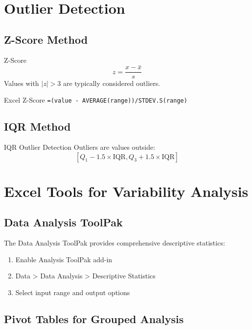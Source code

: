 \documentclass[12pt,a4paper]{book}
\begin{document}
\section{Outlier Detection}

\subsection{Z-Score Method}

\begin{definition}{Z-Score}
\[
z = \frac{x - \bar{x}}{s}
\]
Values with $|z| > 3$ are typically considered outliers.
\end{definition}

\begin{example}{Excel Z-Score}
\texttt{=(value - AVERAGE(range))/STDEV.S(range)}
\end{example}

\subsection{IQR Method}

\begin{definition}{IQR Outlier Detection}
Outliers are values outside:
\[
[Q_1 - 1.5 \times \text{IQR}, Q_3 + 1.5 \times \text{IQR}]
\]
\end{definition}

\section{Excel Tools for Variability Analysis}

\subsection{Data Analysis ToolPak}

The Data Analysis ToolPak provides comprehensive descriptive statistics:
\begin{enumerate}
    \item Enable Analysis ToolPak add-in
    \item Data > Data Analysis > Descriptive Statistics
    \item Select input range and output options
\end{enumerate}

\subsection{Pivot Tables for Grouped Analysis}
\end{document}
